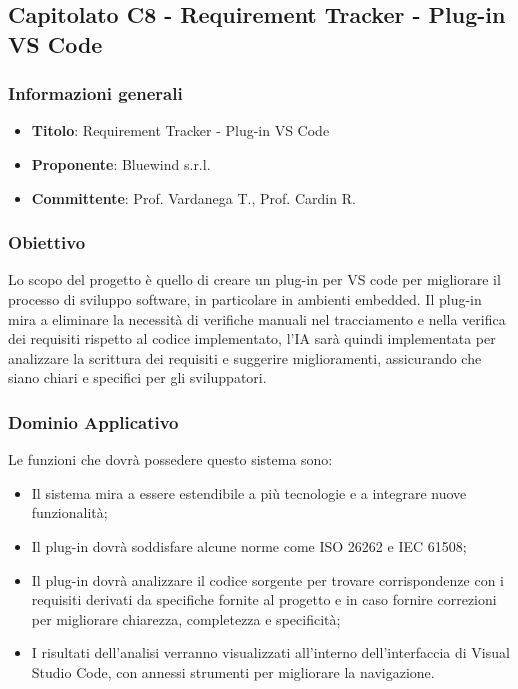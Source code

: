 \subsection{Capitolato C8 - Requirement Tracker - Plug-in VS Code}
     \subsubsection{Informazioni generali}
        \begin{itemize}
            \item \textbf{Titolo}: Requirement Tracker - Plug-in VS Code
            \item \textbf{Proponente}: Bluewind s.r.l.
            \item \textbf{Committente}: Prof. Vardanega T., Prof. Cardin R.
        \end{itemize}
    \subsubsection{Obiettivo}
    Lo scopo del progetto è quello di creare un plug-in per VS code per migliorare il processo di sviluppo software, in particolare in ambienti embedded.
Il plug-in mira a eliminare la necessità di verifiche manuali nel tracciamento e nella verifica dei requisiti rispetto al codice implementato, l’IA sarà quindi implementata per analizzare la scrittura dei requisiti e suggerire miglioramenti, assicurando che siano chiari e specifici per gli sviluppatori. 

     \subsubsection{Dominio Applicativo}
Le funzioni che dovrà possedere questo sistema sono:
\begin{itemize}
    \item Il sistema mira a essere estendibile a più tecnologie e a integrare nuove funzionalità;
    \item  Il plug-in dovrà soddisfare alcune norme come  ISO 26262 e IEC 61508;
    \item Il plug-in dovrà analizzare il codice sorgente per trovare corrispondenze con i requisiti derivati da specifiche fornite al progetto e in caso fornire correzioni per migliorare chiarezza, completezza e specificità;
    \item  I risultati dell’analisi verranno visualizzati all’interno dell’interfaccia di Visual Studio Code, con annessi strumenti per migliorare la navigazione.
\end{itemize}
